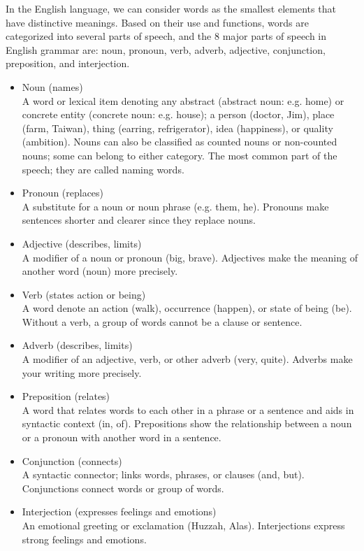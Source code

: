 In the English language, we can consider words as the smallest elements that have distinctive meanings.
Based on their use and functions, words are categorized into several parts of speech, and the 8 major parts of speech in 
English grammar are: noun, pronoun, verb, adverb, adjective, conjunction, preposition, and interjection.
\begin{itemize}
	\item Noun (names)\\
	A word or lexical item denoting any abstract (abstract noun: e.g. home) or concrete entity (concrete noun: e.g. house); a person (doctor, Jim), place (farm, Taiwan), thing (earring, refrigerator), idea (happiness), or quality (ambition). Nouns can also be classified as counted nouns or non-counted nouns; some can belong to either category. 
	The most common part of the speech; they are called naming words.
	
	\item Pronoun (replaces)\\
	A substitute for a noun or noun phrase (e.g. them, he). Pronouns make sentences shorter and clearer since they replace nouns.
	
	\item Adjective (describes, limits)\\
	A modifier of a noun or pronoun (big, brave). Adjectives make the meaning of another word (noun) more precisely.
	
	\item Verb (states action or being)\\
	A word denote an action (walk), occurrence (happen), or state of being (be). Without a verb, a group of words cannot be a clause or sentence.
	\item Adverb (describes, limits)\\
	A modifier of an adjective, verb, or other adverb (very, quite). Adverbs make your writing more precisely.
	
	\item Preposition (relates)\\
	A word that relates words to each other in a phrase or a sentence and aids in syntactic context (in, of). 
	Prepositions show the relationship between a noun or a pronoun with another word in a sentence.
	
	\item Conjunction (connects)\\
	A syntactic connector; links words, phrases, or clauses (and, but). Conjunctions connect words or group of words.
	
	\item Interjection (expresses feelings and emotions)\\
	An emotional greeting or exclamation (Huzzah, Alas). Interjections express strong feelings and emotions.
\end{itemize}

